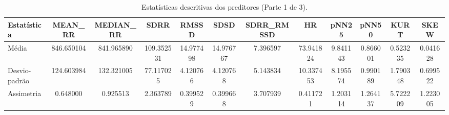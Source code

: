 \documentclass[conference]{IEEEtran}
\begin{document}

\begin{table*}[!b]
\centering
\caption{Estatísticas descritivas dos preditores (Parte 1 de 3).}
\setlength{\tabcolsep}{0pt}
\begin{tabular*}{\textwidth}{@{\extracolsep{\fill}} l S[table-format=4.2] S[table-format=4.2] S[table-format=3.2] S[table-format=2.2] S[table-format=2.2] S[table-format=1.2] S[table-format=2.2] S[table-format=1.2] S[table-format=1.2] S[table-format=1.2] S[table-format=1.2] }
\toprule
\textbf{Estatística} & {MEAN\_RR} & {MEDIAN\_RR} & {SDRR} & {RMSSD} & {SDSD} & {SDRR\_RMSSD} & {HR} & {pNN25} & {pNN50} & {KURT} & {SKEW} \\
\midrule
Média           & 846.650104 & 841.965890 & 109.352531 & 14.977498 & 14.976767 & 7.396597 & 73.941824 & 9.841143 & 0.866001 & 0.523235 & 0.041628 \\
Desvio-padrão   & 124.603984 & 132.321005 & 77.117025 & 4.120766 & 4.120768 & 5.143834 & 10.337453 & 8.195574 & 0.990189 & 1.790348 & 0.699522 \\
Assimetria      & 0.648000 & 0.925513 & 2.363789 & 0.399529 & 0.399668 & 3.707939 & 0.411721 & 1.203114 & 1.264137 & 5.722209 & 1.223005 \\
\bottomrule
\end{tabular*}
\label{tab:estatisticas_part1of3}
\end{table*}
\end{document}
